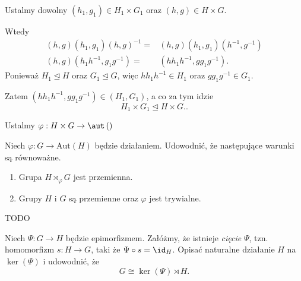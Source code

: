 \begin{solution}
	Ustalmy dowolny $\left( h_1,g_1 \right) \in H_1\times G_1 $ oraz $\left( h,g \right) \in H\times G$.

	Wtedy
	\begin{align*}
		\left( h,g \right) \left( h_1,g_1 \right)\left( h,g \right) ^{-1} =& \left( h,g \right) \left( h_1,g_1 \right)\left( h^{-1},g^{-1} \right) \\ 
		\left( h,g \right) \left( h_1h^{-1}, g_1g^{-1} \right) =& \left( hh_1h^{-1}, gg_1g^{-1} \right)
	.\end{align*}
	Ponieważ $H_1\unlhd H$ oraz $G_1 \unlhd G$, więc $hh_1h^{-1} \in H_1$ oraz $gg_1g^{-1} \in G_1$.

	Zatem $\left( hh_1h^{-1}, gg_1g^{-1} \right) \in \left( H_1, G_1 \right) $, a co za tym idzie
	\[
	H_1\times G_1\unlhd H\times G.
	.\] 

	Ustalmy $\varphi: H\times G \rightarrow \aut\left(\right) $

\end{solution} 
\begin{problem}[9]
	
	Niech $\varphi: G \rightarrow \text{Aut}\left( H \right) $ będzie działaniem. Udowodnić, że następujące warunki są równoważne.
	\begin{enumerate}[label=\alph*)]
		\item Grupa $H\rtimes_{\varphi}G $ jest przemienna.
		\item Grupy $H$ i $G$ są przemienne oraz $\varphi$ jest trywialne.
	\end{enumerate}
\end{problem} 
\begin{solution}
	TODO
\end{solution} 
\begin{problem}[10]
	
	Niech $\Psi: G\rightarrow H$ będzie epimorfizmem. Załóżmy, że istnieje \textit{cięcie} $\Psi$, tzn. homomorfizm $s: H \rightarrow G$, taki że $\Psi \circ s = \id_{H}$. Opisać naturalne działanie $H$ na $\ker(\Psi) $ i udowodnić, że
	\[
	G \cong \ker(\Psi) \rtimes H
	.\] 
\end{problem} 
